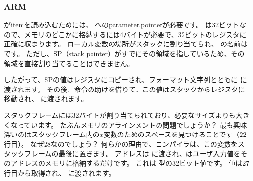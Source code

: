 \subsubsection{ARM}

\myparagraph{\OptimizingKeilVI (\ThumbMode)}



\myindex{\CLanguageElements!\Pointers}

\scanf がitemを読み込むためには、 \Tint へのparameter.pointerが必要です。 
\Tint は32ビットなので、メモリのどこかに格納するには4バイトが必要で、32ビットのレジスタに正確に収まります。 
ローカル変数の場所がスタックに割り当てられ、 
\IDA の名前はです。 ただし、\ac{SP}（\gls{stack pointer}）がすでにその領域を指しているため、その領域を直接割り当てることはできません。 



したがって、\ac{SP}の値はレジスタにコピーされ、フォーマット文字列とともに \scanf に渡されます。 
その後、命令の助けを借りて、この値はスタックからレジスタに移動され、 \printf に渡されます。




スタックフレームには32バイトが割り当てられており、必要なサイズよりも大きくなっています。 たぶんメモリのアラインメントの問題でしょうか？ 
最も興味深いのはスタックフレーム内の$x$変数のためのスペースを見つけることです（22行目）。 
なぜ28なのでしょう？ 何らかの理由で、コンパイラは、この変数をスタックフレームの最後に置きます。 
アドレスは \scanf に渡され、\scanf はユーザ入力値をそのアドレスのメモリに格納するだけです。 
これは \Tint 型の32ビット値です。 
値は27行目から取得され、 \printf に渡されます。
